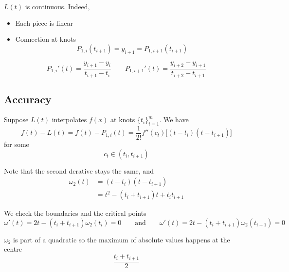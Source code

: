 \begin{remark}
    \( L(t) \) is continuous. Indeed,
    \begin{itemize}
        \item Each piece is linear
        \item Connection at knots \[
                  P_{1,i}(t_{i+1}) = y_{i+1} = P_{1,{i+1}}(t_{i+1})
              \]
    \end{itemize}
\end{remark}

\begin{remark}
    \[
        {P_{1,i}}'(t) = \frac{y_{i+1} - y_i}{t_{i+1} - t_i}
        \qquad
        {P_{1,i+1}}'(t) = \frac{y_{i+2}-y_{i+1}}{t_{i+2}-t_{i+1}}
    \]
\end{remark}

\subsection{Accuracy}

Suppose \( L(t) \) interpolates \( f(x) \) at knots \( \{ t_i \}_{i=1}^{m} \).
We have \[
    f(t) - L(t) = f(t) - P_{1,i}(t) = \frac{1}{2!} f''(c_t) \Big[ (t - t_i)(t - t_{i+1}) \Big]
\] for some \[
    c_t \in ( t_i, t_{i+1} )
\]

Note that the second derative stays the same, and \begin{align*}
    \omega_2(t)
     & = (t - t_i)(t - t_{i+1})
    \\
     & = t^2 - (t_i + t_{i+1})t + t_{i}t_{i+1}
\end{align*}

We check the boundaries and the critical points \[
    \omega'(t) = 2t - (t_i+t_{i+1})\omega_2(t_i) = 0
    \qquad \text{and} \qquad
    \omega'(t) = 2t - (t_i+t_{i+1})\omega_2(t_{i+1}) = 0
\]

\( \omega_2 \) is part of a quadratic so the maximum of absolute values happens at the centre \[
    \frac{t_{i} + t_{i+1}}{2}
\]